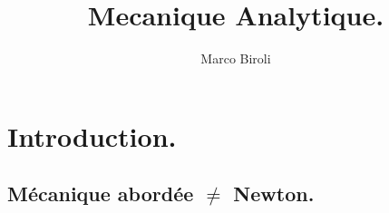 \documentclass[10pt,a4paper]{book}
\author{Marco Biroli}
\title{Mecanique Analytique.}
\begin{document}
\maketitle

\tableofcontents

\chapter{Introduction.}
\section{Mécanique abordée $\neq$ Newton.}
\end{document}
